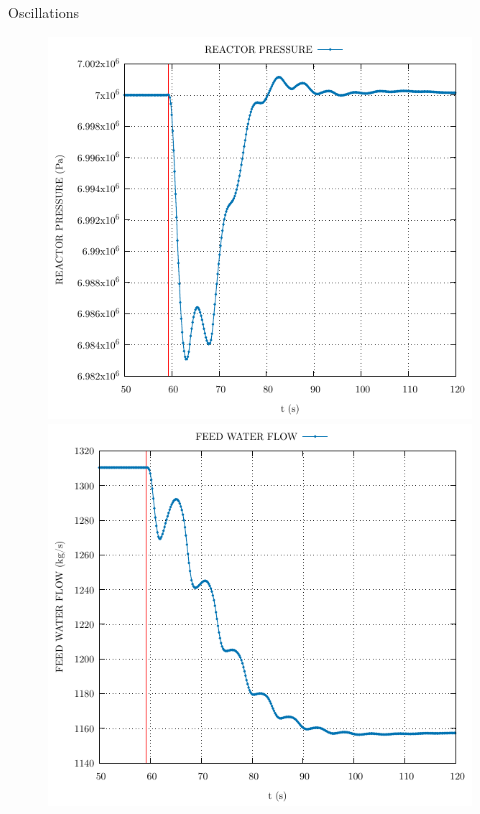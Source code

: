 \begin{frame}{Oscillations}
\begin{figure}
\begin{minipage}{.5\textwidth}
						\includegraphics[width=0.7\linewidth]{./graphs/REACTOR PRESSURE_comp.pdf}
					\end{minipage}%
				\begin{minipage}{.5\textwidth}
						\centering
						\includegraphics[width=.7\linewidth]{./graphs/FEED WATER FLOW_comp.pdf}
					\end{minipage}
			\end{figure}
\end{frame}
